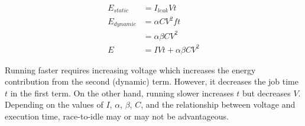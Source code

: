 \documentclass[11pt, letterpaper]{article}
\providecommand{\fig}[1]{
		\noindent
		\begin{center}
			\texttt{[image: \#1]}
		\end{center}
	}
\providecommand{\eq}[1]{
		\begin{align*}
		#1
		\end{align*}
	}
\begin{document}
\eq{
  E_{static} &= I_{leak}Vt \\
  E_{dynamic} &= \alpha C V^2ft \\
  &= \alpha\beta C V^2 \\
  E &= IVt + \alpha \beta CV^2
}

Running faster requires increasing voltage which increases the energy
contribution from the second (dynamic) term. However, it decreases the job time
$t$ in the first term. On the other hand, running slower increases $t$ but
decreases $V$. Depending on the values of $I$, $\alpha$, $\beta$, $C$, and the
relationship between voltage and execution time, race-to-idle may or may not be
advantageous.


% 
% 
% 
% 
% 
% 
% 
\end{document}
